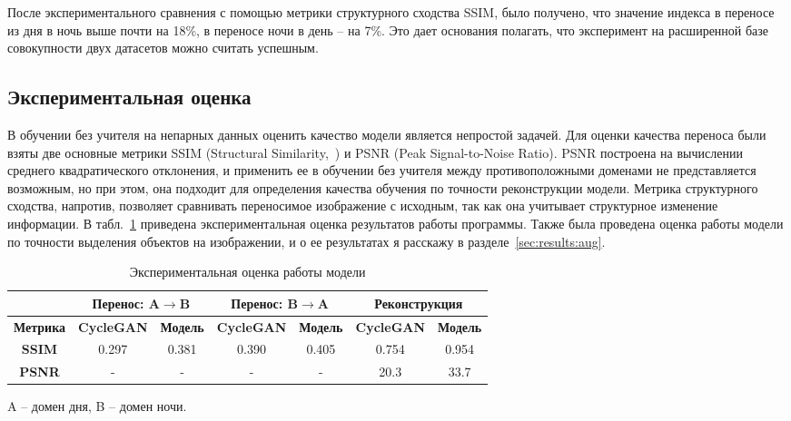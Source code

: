 \documentclass[11pt,a4paper]{extarticle}
\begin{document}
{			\noindent
			После экспериментального сравнения с помощью метрики структурного сходства SSIM, было получено, что значение индекса в переносе из дня в ночь выше почти на 18\%, в переносе ночи в день -- на 7\%.
			Это дает основания полагать, что эксперимент на расширенной базе совокупности двух датасетов можно считать успешным.


	\subsection{Экспериментальная оценка}\label{sec:eval}

		В обучении без учителя на непарных данных оценить качество модели является непростой задачей.
		Для оценки качества переноса были взяты две основные метрики SSIM (Structural Similarity,~\cite{metric:ssim}) и PSNR (Peak Signal-to-Noise Ratio).
		PSNR построена на вычислении среднего квадратического отклонения, и применить ее в обучении без учителя между противоположными доменами не представляется возможным, но при этом, она подходит для определения качества обучения по точности реконструкции модели.
		Метрика структурного сходства, напротив, позволяет сравнивать переносимое изображение с исходным, так как она учитывает структурное изменение информации.
		В табл.~\ref{tab:metrics} приведена экспериментальная оценка результатов работы программы.
		Также была проведена оценка работы модели по точности выделения объектов на изображении, и о ее результатах я расскажу в разделе~\ref{sec:results:aug}.

		\begin{table}[ht]
			\centering
			\begin{tabular}{|c|c|c|c|c|c|c|}
				\hline
				\rowcolor[HTML]{EFEFEF} 
														& \multicolumn{2}{c|}{\cellcolor[HTML]{EFEFEF}\textbf{Перенос: A$\rightarrow$B}} & \multicolumn{2}{c|}{\cellcolor[HTML]{EFEFEF}\textbf{Перенос: B$\rightarrow$A}} & \multicolumn{2}{c|}{\cellcolor[HTML]{EFEFEF}\textbf{Реконструкция}} \\ \hline
				\rowcolor[HTML]{EFEFEF} 
				{\color[HTML]{9A0000} \textbf{Метрика}} & \textbf{CycleGAN}                       & \textbf{Модель}                      & \textbf{CycleGAN}                       & \textbf{Модель}                      & \textbf{CycleGAN}                 & \textbf{Модель}                 \\ \hline
				\cellcolor[HTML]{EFEFEF}\textbf{SSIM}   & 0.297                                   & 0.381                                & 0.390                                   & 0.405                                & 0.754                             & 0.954                           \\ \hline
				\cellcolor[HTML]{EFEFEF}\textbf{PSNR}   & -                                       & -                                    & -                                       & -                                    & 20.3                              & 33.7                            \\ \hline
				\end{tabular}
			\caption{Экспериментальная оценка работы модели}{
				\small{
					A -- домен дня, B -- домен ночи.
				}
			}
			\label{tab:metrics}
		\end{table}
		
}
\end{document}
